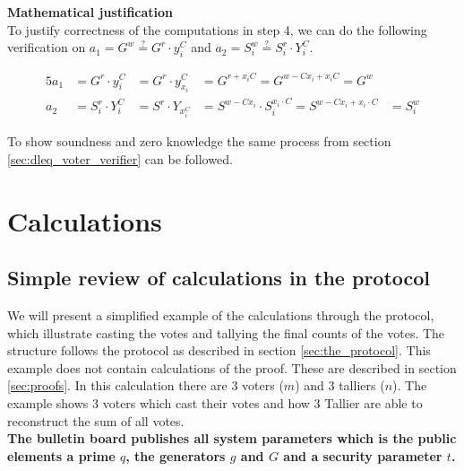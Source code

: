  \noindent
\textbf{Mathematical justification}\\
To justify correctness of the computations in step 4, we can do the following verification on \begin{math}a_1=G^w \stackrel{?}{=} G^r \cdot y_i^C\end{math} and \begin{math}a_2=S_i^w \stackrel{?}{=} S_i^r \cdot Y_i^C\end{math}.


\begin{alignat*}{5}
a_1 &=G^r \cdot y_i^C &=G^r \cdot y_{x_i}^C &=G^{r+x_iC} =G^{w-Cx_i+x_iC} =G^w\\
a_2 &= S_i^r \cdot Y_i^C &=S^r \cdot Y_{x_i^C} &=S^{w-Cx_i} \cdot S_i^{x_i \cdot C} =S^{w-Cx_i+x_i \cdot C}&=S_i^w
\end{alignat*}



\noindent
To show soundness and zero knowledge the same process from section \ref{sec:dleq_voter_verifier} can be followed.


\chapter{Calculations}
\section{Simple review of calculations in the protocol}
\label{sec:simple_review_of_calculations_in_the_protocol}
We will present a simplified example of the calculations through the protocol, which illustrate casting the votes and tallying the final counts of the votes. The structure follows the protocol as described in section \ref{sec:the_protocol}. This example does not contain calculations of the proof. These are described in section \ref{sec:proofs}. In this calculation there are $3$ voters ($m$) and $3$ talliers ($n$). The example shows  3 voters which cast their votes and how 3 Tallier are able to reconstruct the sum of all votes.\\

\noindent
\textbf{The bulletin board publishes all system parameters which is the public elements a prime $q$,  the generators $g$ and $G$ and a security parameter $t$.}


